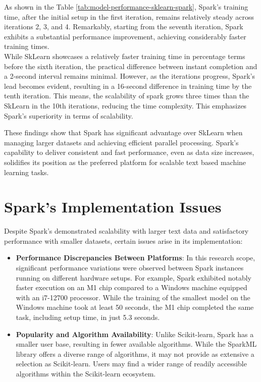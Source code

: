 \documentclass[12pt]{report}
\begin{document}
As shown in the Table \ref{tab:model-performance-sklearn-spark},
Spark's training time, after the initial setup in the first iteration, remains relatively steady across iterations 2, 3, and 4. Remarkably, starting from the seventh iteration, Spark exhibits a substantial performance improvement, achieving considerably faster training times.\\
\indent While SkLearn showcases a relatively faster training time in percentage terms before the sixth iteration, the practical difference between instant completion and a 2-second interval remains minimal. However, as the iterations progress, Spark's lead becomes evident, resulting in a 16-second difference in training time by the tenth iteration. This means, the scalability of spark grows three times than the SkLearn in the 10th iterations, reducing the time complexity. This emphasizes Spark's superiority in terms of scalability.

These findings show that Spark has significant advantage over SkLearn when managing larger datasets and achieving efficient parallel processing. Spark's capability to deliver consistent and fast performance, even as data size increases, solidifies its position as the preferred platform for scalable text based machine learning tasks.

\section{Spark's Implementation Issues}

Despite Spark's demonstrated scalability with larger text data and satisfactory performance with smaller datasets, certain issues arise in its implementation:

\begin{itemize}
    \item \textbf{Performance Discrepancies Between Platforms}: In this research scope, significant performance variations were observed between Spark instances running on different hardware setups. For example, Spark exhibited notably faster execution on an M1 chip compared to a Windows machine equipped with an i7-12700 processor. While the training of the smallest model on the Windows machine took at least 50 seconds, the M1 chip completed the same task, including setup time, in just 5.3 seconds.

    \item \textbf{Popularity and Algorithm Availability}: Unlike Scikit-learn, Spark has a smaller user base, resulting in fewer available algorithms. While the SparkML library offers a diverse range of algorithms, it may not provide as extensive a selection as Scikit-learn. Users may find a wider range of readily accessible algorithms within the Scikit-learn ecosystem.
\end{itemize}
\end{document}
